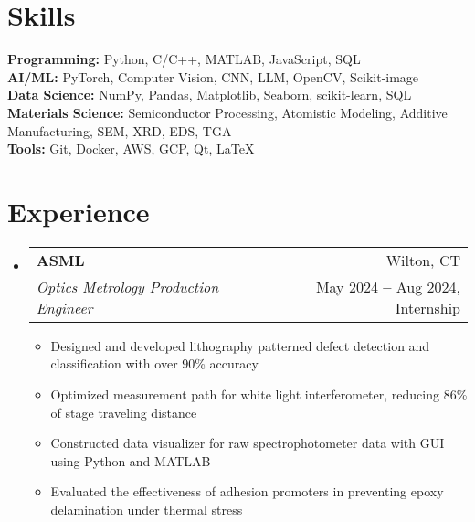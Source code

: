 \documentclass[a4paper,11pt]{article}
\makeatletter
\newcommand{\resumeItem}[1]{
  \item\small{
    {#1 \vspace{-2pt}}
  }
}
\newcommand{\resumeDoubleHeading}[4]{
  \vspace{-2pt}\item
    \begin{tabular*}{0.97\textwidth}[t]{l@{\extracolsep{\fill}}r}
        \textbf{#1} & #2 \\
        \textit{\small#3} & {\small #4} \\
    \end{tabular*}\vspace{-5pt}
}
\newcommand{\resumeSubHeadingListStart}{\begin{itemize}[leftmargin=0.15in, label={}]}
\newcommand{\resumeSubHeadingListEnd}{\end{itemize}}
\newcommand{\resumeItemListStart}{\begin{itemize}}
\newcommand{\resumeItemListEnd}{\end{itemize}\vspace{-5pt}}
\makeatother
\begin{document}
\section{Skills}
  \vspace{2pt}
  \resumeSubHeadingListStart
    \small{\item{
        \textbf{Programming:}{ Python, C/C++, MATLAB, JavaScript, SQL } \\ 
        \vspace{3pt}
        \textbf{AI/ML:}{ PyTorch, Computer Vision, CNN, LLM, OpenCV, Scikit-image } \\
        \vspace{3pt}
        \textbf{Data Science:}{ NumPy, Pandas, Matplotlib, Seaborn, scikit-learn, SQL } \\ 
        \vspace{3pt}
        \textbf{Materials Science:}{ Semiconductor Processing, Atomistic Modeling, Additive Manufacturing, SEM, XRD, EDS, TGA } \\ 
        \vspace{3pt}
        \textbf{Tools:}{ Git, Docker, AWS, GCP, Qt, LaTeX } \\
    }}
  \resumeSubHeadingListEnd



\section{Experience}
  \vspace{3pt}
  \resumeSubHeadingListStart
    \resumeDoubleHeading
      {ASML}{Wilton, CT}
      {Optics Metrology Production Engineer}{May 2024 \textbf{--} Aug 2024, Internship}
        \resumeItemListStart
            \resumeItem{Designed and developed lithography patterned defect detection and classification with over 90\% accuracy}
            \resumeItem{Optimized measurement path for white light interferometer, reducing 86\% of stage traveling distance}
            \resumeItem{Constructed data visualizer for raw spectrophotometer data with GUI using Python and MATLAB}
            \resumeItem{Evaluated the effectiveness of adhesion promoters in preventing epoxy delamination under thermal stress}
        \resumeItemListEnd
    
  \resumeSubHeadingListEnd

\end{document}
